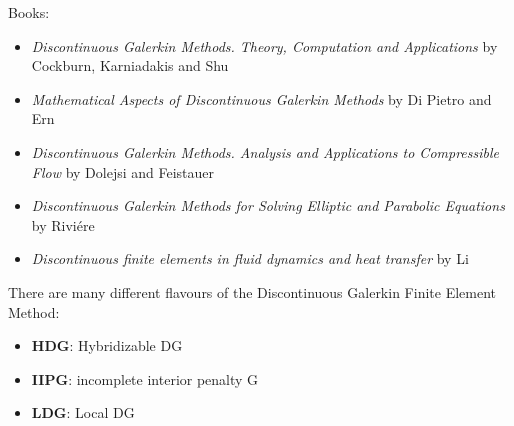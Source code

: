 
Books:

\begin{itemize}
\item {\it Discontinuous Galerkin Methods. Theory, Computation and Applications} by
Cockburn, Karniadakis and Shu \cite{cockburn00}
\item {\it Mathematical Aspects of Discontinuous Galerkin Methods} by Di Pietro and Ern 
\cite{dipietro_ern12}
\item {\it Discontinuous Galerkin Methods. Analysis and Applications to Compressible Flow} by 
Dolejsi and Feistauer \cite{dolejsi_feistauer15}
\item {\it Discontinuous Galerkin Methods for Solving Elliptic and Parabolic Equations} by Rivi{\'e}re
\cite{riviere08}
\item {\it Discontinuous finite elements in fluid dynamics and heat transfer} by Li \cite{li06}
\end{itemize}


There are many different flavours of the Discontinuous Galerkin Finite Element Method:
\begin{itemize}
\item {\bf HDG}: Hybridizable DG \cite{conp10}
\item {\bf IIPG}: incomplete interior penalty G  \cite{dole08}
\item {\bf LDG}: Local DG \cite{cacp02}  
\end{itemize}
